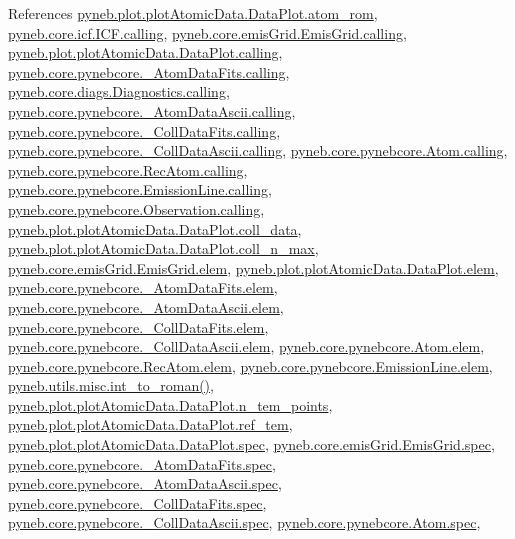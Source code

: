 References \hyperlink{plot_atomic_data_8py_source_l00102}{pyneb.\+plot.\+plot\+Atomic\+Data.\+Data\+Plot.\+atom\+\_\+rom}, \hyperlink{icf_8py_source_l00016}{pyneb.\+core.\+icf.\+I\+C\+F.\+calling}, \hyperlink{emis_grid_8py_source_l00041}{pyneb.\+core.\+emis\+Grid.\+Emis\+Grid.\+calling}, \hyperlink{plot_atomic_data_8py_source_l00042}{pyneb.\+plot.\+plot\+Atomic\+Data.\+Data\+Plot.\+calling}, \hyperlink{pynebcore_8py_source_l00090}{pyneb.\+core.\+pynebcore.\+\_\+\+Atom\+Data\+Fits.\+calling}, \hyperlink{diags_8py_source_l00169}{pyneb.\+core.\+diags.\+Diagnostics.\+calling}, \hyperlink{pynebcore_8py_source_l00311}{pyneb.\+core.\+pynebcore.\+\_\+\+Atom\+Data\+Ascii.\+calling}, \hyperlink{pynebcore_8py_source_l00568}{pyneb.\+core.\+pynebcore.\+\_\+\+Coll\+Data\+Fits.\+calling}, \hyperlink{pynebcore_8py_source_l00918}{pyneb.\+core.\+pynebcore.\+\_\+\+Coll\+Data\+Ascii.\+calling}, \hyperlink{pynebcore_8py_source_l01175}{pyneb.\+core.\+pynebcore.\+Atom.\+calling}, \hyperlink{pynebcore_8py_source_l02572}{pyneb.\+core.\+pynebcore.\+Rec\+Atom.\+calling}, \hyperlink{pynebcore_8py_source_l03263}{pyneb.\+core.\+pynebcore.\+Emission\+Line.\+calling}, \hyperlink{pynebcore_8py_source_l03419}{pyneb.\+core.\+pynebcore.\+Observation.\+calling}, \hyperlink{plot_atomic_data_8py_source_l00072}{pyneb.\+plot.\+plot\+Atomic\+Data.\+Data\+Plot.\+coll\+\_\+data}, \hyperlink{plot_atomic_data_8py_source_l00110}{pyneb.\+plot.\+plot\+Atomic\+Data.\+Data\+Plot.\+coll\+\_\+n\+\_\+max}, \hyperlink{emis_grid_8py_source_l00045}{pyneb.\+core.\+emis\+Grid.\+Emis\+Grid.\+elem}, \hyperlink{plot_atomic_data_8py_source_l00045}{pyneb.\+plot.\+plot\+Atomic\+Data.\+Data\+Plot.\+elem}, \hyperlink{pynebcore_8py_source_l00083}{pyneb.\+core.\+pynebcore.\+\_\+\+Atom\+Data\+Fits.\+elem}, \hyperlink{pynebcore_8py_source_l00304}{pyneb.\+core.\+pynebcore.\+\_\+\+Atom\+Data\+Ascii.\+elem}, \hyperlink{pynebcore_8py_source_l00560}{pyneb.\+core.\+pynebcore.\+\_\+\+Coll\+Data\+Fits.\+elem}, \hyperlink{pynebcore_8py_source_l00910}{pyneb.\+core.\+pynebcore.\+\_\+\+Coll\+Data\+Ascii.\+elem}, \hyperlink{pynebcore_8py_source_l01165}{pyneb.\+core.\+pynebcore.\+Atom.\+elem}, \hyperlink{pynebcore_8py_source_l02565}{pyneb.\+core.\+pynebcore.\+Rec\+Atom.\+elem}, \hyperlink{pynebcore_8py_source_l03267}{pyneb.\+core.\+pynebcore.\+Emission\+Line.\+elem}, \hyperlink{misc_8py_source_l00013}{pyneb.\+utils.\+misc.\+int\+\_\+to\+\_\+roman()}, \hyperlink{plot_atomic_data_8py_source_l00103}{pyneb.\+plot.\+plot\+Atomic\+Data.\+Data\+Plot.\+n\+\_\+tem\+\_\+points}, \hyperlink{plot_atomic_data_8py_source_l00076}{pyneb.\+plot.\+plot\+Atomic\+Data.\+Data\+Plot.\+ref\+\_\+tem}, \hyperlink{plot_atomic_data_8py_source_l00046}{pyneb.\+plot.\+plot\+Atomic\+Data.\+Data\+Plot.\+spec}, \hyperlink{emis_grid_8py_source_l00046}{pyneb.\+core.\+emis\+Grid.\+Emis\+Grid.\+spec}, \hyperlink{pynebcore_8py_source_l00084}{pyneb.\+core.\+pynebcore.\+\_\+\+Atom\+Data\+Fits.\+spec}, \hyperlink{pynebcore_8py_source_l00305}{pyneb.\+core.\+pynebcore.\+\_\+\+Atom\+Data\+Ascii.\+spec}, \hyperlink{pynebcore_8py_source_l00561}{pyneb.\+core.\+pynebcore.\+\_\+\+Coll\+Data\+Fits.\+spec}, \hyperlink{pynebcore_8py_source_l00911}{pyneb.\+core.\+pynebcore.\+\_\+\+Coll\+Data\+Ascii.\+spec}, \hyperlink{pynebcore_8py_source_l01166}{pyneb.\+core.\+pynebcore.\+Atom.\+spec}, 